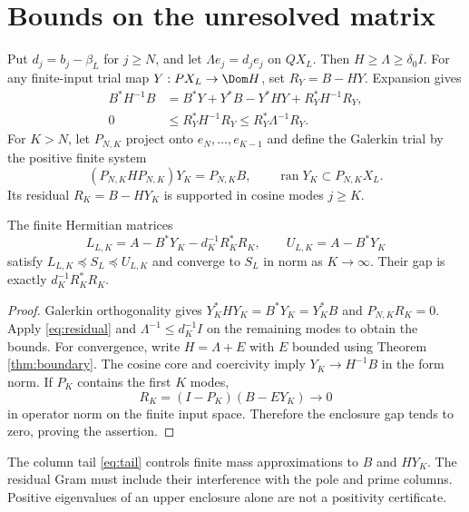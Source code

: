 \section{Bounds on the unresolved matrix}
Put $d_j=b_j-\beta_L$ for $j\ge N$, and let $\Lambda e_j=d_je_j$ on
$QX_L$. Then $H\ge\Lambda\ge\delta_0I$. For any finite-input trial map
$Y:PX_L\to\Dom H$, set $R_Y=B-HY$. Expansion gives
\begin{align}
B^*H^{-1}B&=B^*Y+Y^*B-Y^*HY+R_Y^*H^{-1}R_Y,\label{eq:residual}\\
0&\le R_Y^*H^{-1}R_Y\le R_Y^*\Lambda^{-1}R_Y.
\end{align}
For $K>N$, let $P_{N,K}$ project onto $e_N,\ldots,e_{K-1}$ and define
the Galerkin trial by the positive finite system
\[
(P_{N,K}HP_{N,K})Y_K=P_{N,K}B,\qquad
\operatorname{ran}Y_K\subset P_{N,K}X_L.
\]
Its residual $R_K=B-HY_K$ is supported in cosine modes $j\ge K$.
\begin{theorem}\label{thm:enclosure}
The finite Hermitian matrices
\begin{equation}\label{eq:lower-matrix}
L_{L,K}=A-B^*Y_K-d_K^{-1}R_K^*R_K,\qquad
U_{L,K}=A-B^*Y_K
\end{equation}
satisfy $L_{L,K}\preceq S_L\preceq U_{L,K}$ and converge to $S_L$ in norm
as $K\to\infty$. Their gap is exactly $d_K^{-1}R_K^*R_K$.
\end{theorem}
\begin{proof}
Galerkin orthogonality gives
$Y_K^*HY_K=B^*Y_K=Y_K^*B$ and $P_{N,K}R_K=0$.
Apply \eqref{eq:residual} and
$\Lambda^{-1}\le d_K^{-1}I$ on the remaining modes to obtain the bounds.
For convergence, write $H=\Lambda+E$ with $E$ bounded using
Theorem \ref{thm:boundary}. The cosine core and coercivity imply
$Y_K\to H^{-1}B$ in the form norm. If $P_K$ contains the first $K$ modes,
\[
R_K=(I-P_K)(B-EY_K)\longrightarrow0
\]
in operator norm on the finite input space. Therefore the enclosure gap
tends to zero, proving the assertion.
\end{proof}
The column tail \eqref{eq:tail} controls finite mass approximations to $B$
and $HY_K$. The residual Gram must include their interference with the
pole and prime columns. Positive eigenvalues of an upper enclosure alone
are not a positivity certificate.

